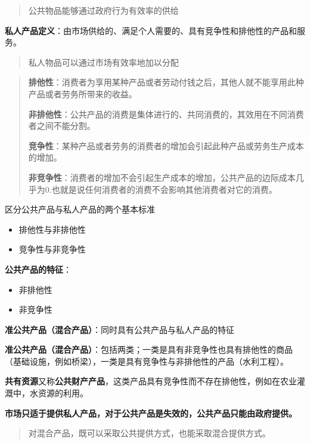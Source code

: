 \documentclass[
]{book}
\providecommand{\tightlist}{%
  \setlength{\itemsep}{0pt}\setlength{\parskip}{0pt}}
\theoremstyle{definition}
\theoremstyle{definition}
\theoremstyle{definition}
\theoremstyle{definition}
\theoremstyle{remark}
\begin{document}
\begin{quote}
公共物品能够通过政府行为有效率的供给
\end{quote}

\textbf{私人产品定义}：由市场供给的、满足个人需要的、具有竞争性和排他性的产品和服务。

\begin{quote}
私人物品可以通过市场有效率地加以分配
\end{quote}

\begin{quote}
\textbf{排他性}：消费者为享用某种产品或者劳动付钱之后，其他人就不能享用此种产品或者劳务所带来的收益。

\textbf{非排他性}：公共产品的消费是集体进行的、共同消费的，其效用在不同消费者之间不能分割。

\textbf{竞争性}：某种产品或者劳务的消费者的增加会引起此种产品或劳务生产成本的增加。

\textbf{非竞争性}：消费者的增加不会引起生产成本的增加，公共产品的边际成本几乎为0.也就是说任何消费者的消费不会影响其他消费者对它的消费。
\end{quote}

区分公共产品与私人产品的两个基本标准

\begin{itemize}
\tightlist
\item
  排他性与非排他性
\item
  竞争性与非竞争性
\end{itemize}

\textbf{公共产品的特征}：

\begin{itemize}
\tightlist
\item
  非排他性
\item
  非竞争性
\end{itemize}

\textbf{准公共产品（混合产品）}：同时具有公共产品与私人产品的特征

\textbf{准公共产品（混合产品）}：包括两类；一类是具有非竞争性也具有排他性的商品（基础设施，例如桥梁），一类是具有竞争性与非排他性的产品（水利工程）。

\textbf{共有资源}又称\textbf{公共财产产品}，这类产品具有竞争性而不存在排他性，例如在农业灌溉中，水资源的利用。

\textbf{市场只适于提供私人产品，对于公共产品是失效的，公共产品只能由政府提供。}

\begin{quote}
对混合产品，既可以采取公共提供方式，也能采取混合提供方式。
\end{quote}
\end{document}
